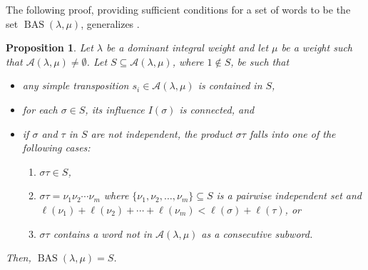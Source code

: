 \documentclass{amsart}
\newtheorem{proposition}[theorem]{Proposition}
\theoremstyle{definition}
\DeclareMathOperator{\BAS}{BAS}
\newcommand{\calA}{\mathcal{A}}
\begin{document}
The following proof, providing sufficient conditions for a set of words to be the set $\BAS(\lambda,\mu)$, generalizes \cite[Theorem 4.5]{Lauren}.

\begin{proposition}\label{prop:BAS_properties}
    Let $\lambda$ be a dominant integral weight and let $\mu$ be a weight such that $\calA(\lambda,\mu)\neq\emptyset$.
    Let $S \subseteq \calA(\lambda, \mu)$, where $1 \notin S$, be such that
    \begin{itemize}
        \item[(C1)] any simple transposition $s_i\in \calA(\lambda,\mu)$ is contained in $S$,
        \item[(C2)] for each $\sigma \in S$, its influence $I(\sigma)$ is connected, and
        \item[(C3)] if $\sigma$ and $\tau$ in $S$ are not independent, the product $\sigma\tau$ falls into one of the following cases: \begin{enumerate}
        \item $\sigma\tau\in S$,
        \item $\sigma\tau=\nu_1\nu_2\cdots\nu_m$ where
        $\{\nu_1,\nu_2,\ldots,\nu_m\}\subseteq S$ is a pairwise independent set and \\
        $\ell(\nu_1)+\ell(\nu_2)+\cdots+\ell(\nu_m)<\ell(\sigma)+\ell(\tau)$, or
        \item $\sigma\tau$ contains a word not in $\calA(\lambda,\mu)$ as a consecutive subword.
    \end{enumerate}
    \end{itemize}
    Then, $\BAS(\lambda,\mu)=S$.
\end{proposition}
\end{document}
